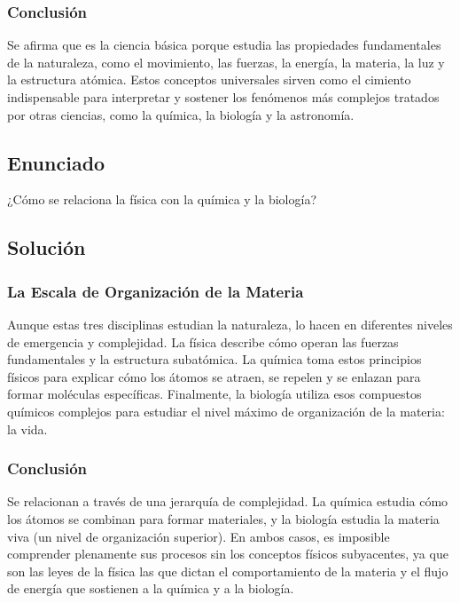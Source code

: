 \documentclass[12pt, a4paper]{article}
\begin{document}
\subsubsection*{Conclusión}
Se afirma que es la ciencia básica porque estudia las propiedades fundamentales de la naturaleza, como el movimiento, las fuerzas, la energía, la materia, la luz y la estructura atómica. Estos conceptos universales sirven como el cimiento indispensable para interpretar y sostener los fenómenos más complejos tratados por otras ciencias, como la química, la biología y la astronomía.

\newpage

\subsection*{Enunciado}
¿Cómo se relaciona la física con la química y la biología?

\subsection*{Solución}

\subsubsection*{La Escala de Organización de la Materia}
Aunque estas tres disciplinas estudian la naturaleza, lo hacen en diferentes niveles de emergencia y complejidad. La física describe cómo operan las fuerzas fundamentales y la estructura subatómica. La química toma estos principios físicos para explicar cómo los átomos se atraen, se repelen y se enlazan para formar moléculas específicas. Finalmente, la biología utiliza esos compuestos químicos complejos para estudiar el nivel máximo de organización de la materia: la vida.

\subsubsection*{Conclusión}
Se relacionan a través de una jerarquía de complejidad. La química estudia cómo los átomos se combinan para formar materiales, y la biología estudia la materia viva (un nivel de organización superior). En ambos casos, es imposible comprender plenamente sus procesos sin los conceptos físicos subyacentes, ya que son las leyes de la física las que dictan el comportamiento de la materia y el flujo de energía que sostienen a la química y a la biología.

\newpage
\end{document}
